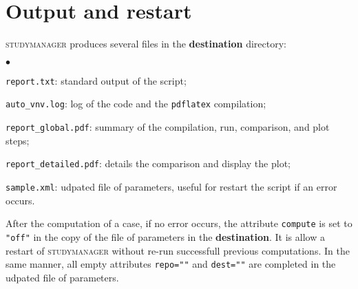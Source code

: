 \documentclass[a4paper,10pt,twoside]{csshortdoc}
\begin{document}
\section{Output and restart}\label{sec:restart}

\textsc{studymanager} produces several files in the \textbf{destination} directory:
\begin{list}{$\bullet$}{}
\item \texttt{report.txt}: standard output of the script;
\item \texttt{auto\_vnv.log}: log of the code and the \texttt{pdflatex}
compilation;
\item \texttt{report\_global.pdf}: summary of the compilation, run, comparison,
and plot steps;
\item \texttt{report\_detailed.pdf}: details the comparison and display the
plot;
\item \texttt{sample.xml}: udpated file of parameters, useful for restart the
script if an error occurs.
\end{list}

After the computation of a case, if no error occurs, the attribute
\texttt{compute} is set to \texttt{"off"} in the copy of the file of parameters
in the \textbf{destination}. It is allow a restart of \textsc{studymanager} without
re-run successfull previous computations.
In the same manner, all empty attributes \texttt{repo=""} and \texttt{dest=""}
are completed in the udpated file of parameters.
\end{document}
